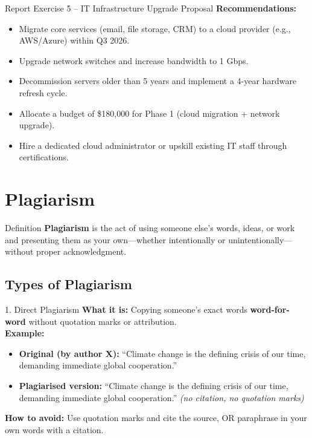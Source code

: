 \documentclass[12pt,a4paper]{article}
\begin{document}
\begin{exbox}{Report Exercise 5 -- IT Infrastructure Upgrade Proposal}
\textbf{Recommendations:}
\begin{itemize}[noitemsep]
    \item Migrate core services (email, file storage, CRM) to a cloud provider (e.g., AWS/Azure) within Q3 2026.
    \item Upgrade network switches and increase bandwidth to 1 Gbps.
    \item Decommission servers older than 5 years and implement a 4-year hardware refresh cycle.
    \item Allocate a budget of \$180,000 for Phase 1 (cloud migration + network upgrade).
    \item Hire a dedicated cloud administrator or upskill existing IT staff through certifications.
\end{itemize}
\end{exbox}

\newpage

\section{Plagiarism}

\begin{keybox}{Definition}
\textbf{Plagiarism} is the act of using someone else's words, ideas, or work and presenting them as your own---whether intentionally or unintentionally---without proper acknowledgment.
\end{keybox}

\subsection{Types of Plagiarism}

\begin{warnbox}{1. Direct Plagiarism}
\textbf{What it is:} Copying someone's exact words \textbf{word-for-word} without quotation marks or attribution.\\[0.2cm]
\textbf{Example:}
\begin{itemize}[noitemsep]
    \item \textbf{Original (by author X):} ``Climate change is the defining crisis of our time, demanding immediate global cooperation.''
    \item \textbf{Plagiarised version:} ``Climate change is the defining crisis of our time, demanding immediate global cooperation.'' \textit{(no citation, no quotation marks)}
\end{itemize}
\textbf{How to avoid:} Use quotation marks and cite the source, OR paraphrase in your own words with a citation.
\end{warnbox}
\end{document}
